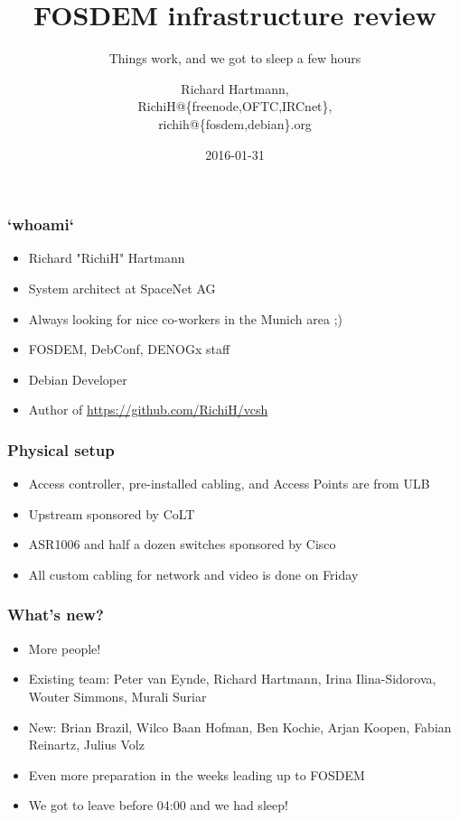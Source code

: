 \documentclass[t]{beamer}
\title{FOSDEM infrastructure review}
\subtitle{Things work, and we got to sleep a few hours}
\author{Richard Hartmann,\\
RichiH@\{freenode,OFTC,IRCnet\},\\
richih@\{fosdem,debian\}.org}
\date{2016-01-31}
\begin{document}
\setcounter{tocdepth}{1}

\begin{frame}
	\titlepage
\end{frame}




\begin{frame}
	\frametitle{`whoami`}
	\begin{itemize}
		\item Richard "RichiH" Hartmann
		\item System architect at SpaceNet AG
		\item Always looking for nice co-workers in the Munich area ;)
		\item FOSDEM, DebConf, DENOGx staff
		\item Debian Developer
		\item Author of \url{https://github.com/RichiH/vcsh}
	\end{itemize}
\end{frame}


\begin{frame}
	\frametitle{Physical setup}
	\vfill
	\begin{itemize}
		\item Access controller, pre-installed cabling, and Access Points are from ULB
		\item Upstream sponsored by CoLT
		\item ASR1006 and half a dozen switches sponsored by Cisco
		\item All custom cabling for network and video is done on Friday
	\end{itemize}
	\vfill
\end{frame}

\begin{frame}
	\frametitle{What's new?}
	\vfill
	\begin{itemize}
		\item More people!
		\item Existing team: Peter van Eynde,  Richard Hartmann, Irina Ilina-Sidorova, Wouter Simmons, Murali Suriar
		\item New: Brian Brazil, Wilco Baan Hofman, Ben Kochie, Arjan Koopen, Fabian Reinartz, Julius Volz
		\item Even more preparation in the weeks leading up to FOSDEM
		\item We got to leave before 04:00 and we had sleep!
	\end{itemize}
	\vfill
\end{frame}
\end{document}

